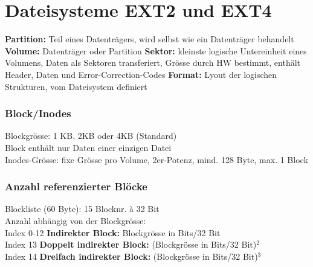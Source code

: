 \section{Dateisysteme EXT2 und EXT4}
\textbf{Partition: }Teil eines Datenträgers, wird selbst wie ein Datenträger behandelt
\textbf{Volume: }Datenträger oder Partition
\textbf{Sektor: }kleinste logische Untereinheit eines Volumens, Daten als Sektoren transferiert, Grösse durch HW bestimmt, enthält Header, Daten und Error-Correction-Codes
\textbf{Format: }Lyout der logischen Strukturen, vom Dateisystem definiert

\subsubsection{Block/Inodes}
Blockgrösse: 1 KB, 2KB oder 4KB (Standard)\\
Block enthält nur Daten einer einzigen Datei\\
Inodes-Grösse: fixe Grösse pro Volume, 2er-Potenz, mind. 128 Byte, max. 1 Block

\subsubsection{Anzahl referenzierter Blöcke}
Blockliste (60 Byte): 15 Blocknr. à 32 Bit\\
Anzahl abhängig von der Blockgrösse:\\
Index 0-12 \textbf{Indirekter Block:} Blockgrösse in Bits/32 Bit\\
Index 13 \textbf{Doppelt indirekter Block:} (Blockgrösse in Bits/32 Bit)$^{2}$\\
Index 14 \textbf{Dreifach indirekter Block:} (Blockgrösse in Bits/32 Bit)$^3$


